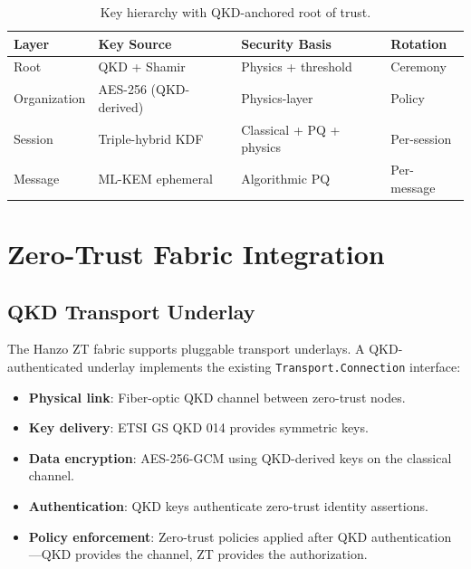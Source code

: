 \documentclass[11pt,letterpaper]{article}
\begin{document}
\begin{table}[H]
\centering
\begin{tabular}{@{}llll@{}}
\toprule
\textbf{Layer} & \textbf{Key Source} & \textbf{Security Basis} & \textbf{Rotation} \\
\midrule
Root & QKD + Shamir & Physics + threshold & Ceremony \\
Organization & AES-256 (QKD-derived) & Physics-layer & Policy \\
Session & Triple-hybrid KDF & Classical + PQ + physics & Per-session \\
Message & ML-KEM ephemeral & Algorithmic PQ & Per-message \\
\bottomrule
\end{tabular}
\caption{Key hierarchy with QKD-anchored root of trust.}
\label{tab:key-hierarchy-qkd}
\end{table}

\section{Zero-Trust Fabric Integration}

\subsection{QKD Transport Underlay}

The Hanzo ZT fabric supports pluggable transport underlays. A QKD-authenticated underlay implements the existing \texttt{Transport.Connection} interface:

\begin{itemize}
\item \textbf{Physical link}: Fiber-optic QKD channel between zero-trust nodes.
\item \textbf{Key delivery}: ETSI GS QKD 014 provides symmetric keys.
\item \textbf{Data encryption}: AES-256-GCM using QKD-derived keys on the classical channel.
\item \textbf{Authentication}: QKD keys authenticate zero-trust identity assertions.
\item \textbf{Policy enforcement}: Zero-trust policies applied after QKD authentication---QKD provides the channel, ZT provides the authorization.
\end{itemize}

\end{document}

